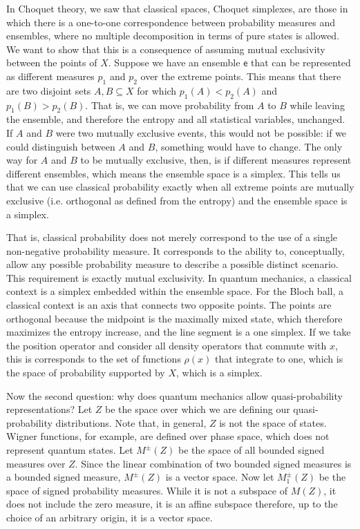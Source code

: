 \documentclass[10pt,twocolumn, nofootinbib]{revtex4-2}
\newcommand{\ens}[1][e] {\mathsf{#1}} %
\begin{document}
In Choquet theory, we saw that classical spaces, Choquet simplexes, are those in which there is a one-to-one correspondence between probability measures and ensembles, where no multiple decomposition in terms of pure states is allowed. We want to show that this is a consequence of assuming mutual exclusivity between the points of $X$. Suppose we have an ensemble $\ens$ that can be represented as different measures $p_1$ and $p_2$ over the extreme points. This means that there are two disjoint sets $A, B \subseteq X$ for which $p_1(A) < p_2(A)$ and $p_1(B) > p_2(B)$. That is, we can move probability from $A$ to $B$ while leaving the ensemble, and therefore the entropy and all statistical variables, unchanged. If $A$ and $B$ were two mutually exclusive events, this would not be possible: if we could distinguish between $A$ and $B$, something would have to change. The only way for $A$ and $B$ to be mutually exclusive, then, is if different measures represent different ensembles, which means the ensemble space is a simplex. This tells us that we can use classical probability exactly when all extreme points are mutually exclusive (i.e. orthogonal as defined from the entropy) and the ensemble space is a simplex.

That is, classical probability does not merely correspond to the use of a single non-negative probability measure. It corresponds to the ability to, conceptually, allow any possible probability measure to describe a possible distinct scenario. This requirement is exactly mutual exclusivity. In quantum mechanics, a classical context is a simplex embedded within the ensemble space. For the Bloch ball, a classical context is an axis that connects two opposite points. The points are orthogonal because the midpoint is the maximally mixed state, which therefore maximizes the entropy increase, and the line segment is a one simplex. If we take the position operator and consider all density operators that commute with $x$, this is corresponds to the set of functions $\rho(x)$ that integrate to one, which is the space of probability supported by $X$, which is a simplex.

Now the second question: why does quantum mechanics allow quasi-probability representations? Let $Z$ be the space over which we are defining our quasi-probability distributions. Note that, in general, $Z$ is not the space of states. Wigner functions, for example, are defined over phase space, which does not represent quantum states. Let $M^{\pm}(Z)$ be the space of all bounded signed measures over $Z$. Since the linear combination of two bounded signed measures is a bounded signed measure, $M^{\pm}(Z)$ is a vector space. Now let $M_1^{\pm}(Z)$ be the space of signed probability measures. While it is not a subspace of $M(Z)$, it does not include the zero measure, it is an affine subspace therefore, up to the choice of an arbitrary origin, it is a vector space.
\end{document}
